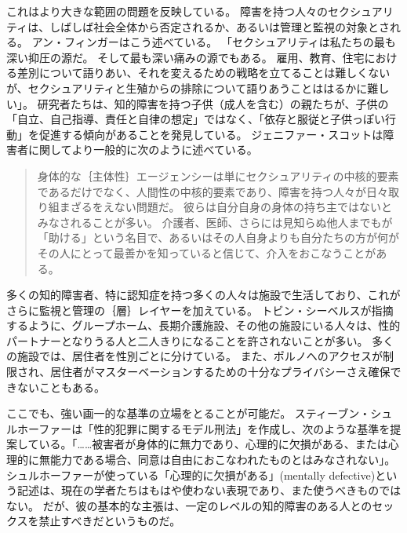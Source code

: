 \documentclass[paper=a4,book,openany]{jlreq}
\begin{document}
これはより大きな範囲の問題を反映している。
障害を持つ人々のセクシュアリティは、しばしば社会全体から否定されるか、あるいは管理と監視の対象とされる。
アン・フィンガーはこう述べている。
「セクシュアリティは私たちの最も深い抑圧の源だ。
そして最も深い痛みの源でもある。
雇用、教育、住宅における差別について語りあい、それを変えるための戦略を立てることは難しくないが、セクシュアリティと生殖からの排除について語りあうことははるかに難しい」\citep[p.9]{finger92:_forbid_fruit}。
研究者たちは、知的障害を持つ子供（成人を含む）の親たちが、子供の「自立、自己指導、責任と自律の想定」ではなく、「依存と服従と子供っぽい行動」を促進する傾向があることを発見している\citep[p.196]{mill10:_negot_auton_famil}。
ジェニファー・スコットは障害者に関してより一般的に次のように述べている。

\begin{quote}
身体的な｛主体性｝{エージェンシー}は単にセクシュアリティの中核的要素であるだけでなく、人間性の中核的要素であり、障害を持つ人々が日々取り組まざるをえない問題だ。
彼らは自分自身の身体の持ち主ではないとみなされることが多い。
介護者、医師、さらには見知らぬ他人までもが「助ける」という名目で、あるいはその人自身よりも自分たちの方が何がその人にとって最善かを知っていると信じて、介入をおこなうことがある。
\citep[p.218]{scott15:_can_disab_peopl_have_sex}
\end{quote}

多くの知的障害者、特に認知症を持つ多くの人々は施設で生活しており、これがさらに監視と管理の｛層｝{レイヤー}を加えている。
トビン・シーベルスが指摘するように、グループホーム、長期介護施設、その他の施設にいる人々は、性的パートナーとなりうる人と二人きりになることを許されないことが多い。
多くの施設では、居住者を性別ごとに分けている。
また、ポルノへのアクセスが制限され、居住者がマスターベーションするための十分なプライバシーさえ確保できないこともある\citep[p.45]{siebers12:_sexual_cultur_disab_peopl}。

ここでも、強い画一的な基準の立場をとることが可能だ。
スティーブン・シュルホーファーは「性的犯罪に関するモデル刑法」を作成し、次のような基準を提案している。「……被害者が身体的に無力であり、心理的に欠損がある、または心理的に無能力である場合、同意は自由におこなわれたものとはみなされない」\citep[p.283]{schulhofer98:_unwan_sex}。
シュルホーファーが使っている「心理的に欠損がある」(mentally defective)という記述は、現在の学者たちはもはや使わない表現であり、また使うべきものではない。
だが、彼の基本的な主張は、一定のレベルの知的障害のある人とのセックスを禁止すべきだというものだ。
\end{document}
